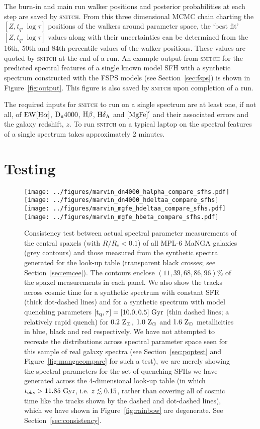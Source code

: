 \documentclass[useAMS,usenatbib]{mn2e}
\def\lesssim{\mathrel{\hbox{\rlap{\hbox{\lower3pt\hbox{$\sim$}}}\hbox{\raise2pt\hbox{$<$}}}}}
\begin{document}
The burn-in and main run walker positions and posterior probabilities at each step are saved by \textsc{snitch}. From this three dimensional MCMC chain charting the $[Z, t_q, \log \tau]$ positions of the walkers around parameter space, the `best fit' $[Z, t_q, \log \tau]$ values along with their uncertainties can be determined from the 16th, 50th and 84th percentile values of the walker positions. These values are quoted by \textsc{snitch} at the end of a run. An example output from \textsc{snitch} for the predicted spectral features of a single known model SFH with a synthetic spectrum constructed with the FSPS models (see Section~\ref{sec:fsps}) is shown in Figure~\ref{fig:output}. This figure is also saved by \textsc{snitch} upon completion of a run.  


The required inputs for \textsc{snitch} to run on a single spectrum are at least one, if not all, of $\rm{EW}[\rm{H}\alpha]$, $\rm{D}_n4000$, $\rm{H}\beta$, $\rm{H}\delta_A$ and $\rm{[MgFe]}^{\prime}$ and their associated errors and the galaxy redshift, $z$. To run \textsc{snitch} on a typical laptop on the spectral features of a single spectrum takes approximately 2 minutes. 

\section{Testing}\label{sec:test}

\begin{figure*}
\centering
\texttt{[image: ../figures/marvin\_dn4000\_halpha\_compare\_sfhs.pdf]}
\texttt{[image: ../figures/marvin\_dn4000\_hdeltaa\_compare\_sfhs]}
\texttt{[image: ../figures/marvin\_mgfe\_hdeltaa\_compare\_sfhs.pdf]}
\texttt{[image: ../figures/marvin\_mgfe\_hbeta\_compare\_sfhs.pdf]}
\caption{Consistency test between actual spectral parameter measurements of the central spaxels (with $R/R_e < 0.1$) of all MPL-6 MaNGA galaxies (grey contours) and those measured from the synthetic spectra generated for the look-up table (transparent black crosses; see Section~\ref{sec:emcee}). The contours enclose $(11, 39, 68, 86, 96)\%$ of the spaxel measurements in each panel. We also show the tracks across cosmic time for a synthetic spectrum with constant SFR (thick dot-dashed lines) and for a synthetic spectrum with model quenching parameters $[\rm{t}_q, \tau] = [10.0, 0.5]~\rm{Gyr}$ (thin dashed lines; a relatively rapid quench) for $0.2~\rm{Z}_{\odot}$, $1.0~\rm{Z}_{\odot}$ and $1.6~\rm{Z}_{\odot}$ metallicities in blue, black and red respectively. We have not attempted to recreate the distributions across spectral parameter space seen for this sample of real galaxy spectra (see Section~\ref{sec:poptest} and Figure~\ref{fig:mangacompare} for such a test), we are merely showing the spectral parameters for the set of quenching SFHs we have generated across the 4-dimensional look-up table (in which $t_{obs} > 11.85~\rm{Gyr}$, i.e. $z \lesssim 0.15$, rather than covering all of cosmic time like the tracks shown by the dashed and dot-dashed lines), which we have shown in Figure~\ref{fig:rainbow} are degenerate. See Section~\ref{sec:consistency}.}
\label{fig:compare_manga_specmeas}
\end{figure*}
\end{document}
